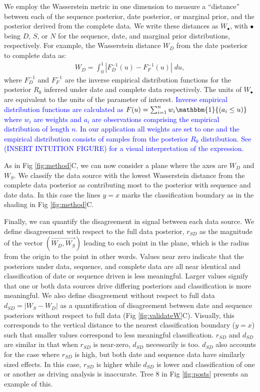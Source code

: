 \documentclass{article}
\begin{document}
We  employ the Wasserstein metric in one dimension to measure a ``distance'' between each of the sequence posterior, date posterior, or marginal prior, and the posterior derived from the complete data. We write these distances as $W_{\bullet}$, with $\bullet$ being $D$, $S$, or $N$ for the sequence, date, and marginal prior distributions, respectively. For example, the Wasserstein distance $W_D$ from the date posterior to complete data as:
\begin{align*}
W_D = \int_0^1 |F_{D}^{-1}(u)-F_{F}^{-1}(u)| \; du, 
\end{align*}
where $F_{D}^{-1}$ and $F_{F}^{-1}$ are the inverse empirical distribution functions for the posterior $R_{0}$ inferred under date and complete data respectively. The units of $W_{\bullet}$ are equivalent to the units of the parameter of interest. \textcolor{blue}{Inverse empirical distribution functions are calculated as $F(u) = \sum_{i=1}^{n} w_{i}\mathbbm{1}{(a_{i}\leq u)}$ where $w_{i}$ are weights and $a_{i}$ are observations comprising the empirical distribution of length $n$. In our application all weights are set to one and the empirical distribution consists of samples from the posterior $R_{0}$ distribution. See (INSERT INTUITION FIGURE) for a visual interpretation of the expression.} 

As in Fig \ref{fig:method}C, we can now consider a plane where the axes are $W_{D}$ and $W_{S}$. We classify the data source with the lowest Wasserstein distance from the complete data posterior as contributing most to the posterior with sequence and date data. In this case the lines $y=x$ marks the classification boundary as in the shading in Fig \ref{fig:method}C.

Finally, we can quantify the disagreement in signal between each data source. We define disagreement with respect to the full data posterior, $r_{SD}$ as the magnitude of the vector $(\overrightarrow{W_{D}, W_{S}})$ leading to each point in the plane, which is the radius from the origin to the point in other words. Values near zero indicate that the posteriors under data, sequence, and complete data are all near identical and classification of date or sequence driven is less meaningful. Larger values signify that one or both data sources drive differing posteriors and classification is more meaningful. We also define disagreement without respect to full data $d_{SD} = | W_{S} - W_{D} |$ as a quantification of disagreement between date and sequence posteriors without respect to full data (Fig \ref{fig:validateW}C). Visually, this corresponds to the vertical distance to the nearest classification boundary ($y=x$) such that smaller values correspond to less meaningful classification. $r_{SD}$ and $d_{SD}$ are similar in that when $r_{SD}$ is near-zero,  $d_{SD}$ necessarily is too. $d_{SD}$ also accounts for the case where $r_{SD}$ is high, but both date and sequence data have similarly sized effects. In this case, $r_{SD}$ is higher while $d_{SD}$ is lower and classification of one or another as driving analysis is inaccurate. Tree 8 in Fig \ref{fig:posts} presents an example of this.
\end{document}
